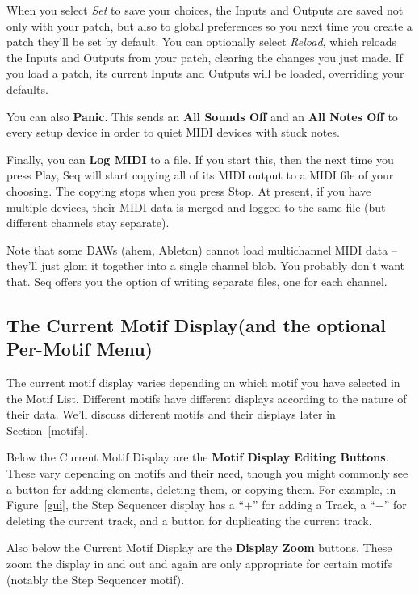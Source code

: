 \documentclass[twoside,10pt]{article}
\begin{document}
When you select {\it Set} to save your choices, the Inputs and Outputs are saved not only with your patch, but also to global preferences so you next time you create a patch they'll be set by default.  You can optionally select {\it Reload}, which reloads the Inputs and Outputs from your patch, clearing the changes you just made.  If you load a patch, its current Inputs and Outputs will be loaded, overriding your defaults.

You can also {\bf Panic}.  This sends an {\bf All Sounds Off} and an {\bf All Notes Off} to every setup device in order to quiet MIDI devices with stuck notes.

Finally, you can {\bf Log MIDI} to a file.  If you start this, then the next time you press Play, Seq will start copying all of its MIDI output to a MIDI file of your choosing.  The copying stops when you press Stop.  At present, if you have multiple devices, their MIDI data is merged and logged to the same file (but different channels stay separate).  

Note that some DAWs (ahem, Ableton) cannot load multichannel MIDI data -- they'll just glom it together into a single channel blob.  You probably don't want that.  Seq offers you the option of writing separate files, one for each channel.

\subsection{The Current Motif Display\quad (and the optional Per-Motif Menu)}

The current motif display varies depending on which motif you have selected in the Motif List.  Different motifs have different displays according to the nature of their data.  We'll discuss different motifs and their displays later in Section~\ref{motifs}.  

 Below the Current Motif Display are the {\bf Motif Display Editing Buttons}.  These vary depending on motifs and their need, though you might commonly see a button for adding elements, deleting them, or copying them.  For example, in Figure~\ref{gui}, the Step Sequencer display has a ``\(+\)'' for adding a Track, a ``\(-\)'' for deleting the current track, and a button for duplicating the current track.

Also below the Current Motif Display are the {\bf Display Zoom} buttons.  These zoom the display in and out and again are only appropriate for certain motifs (notably the Step Sequencer motif).
\end{document}
